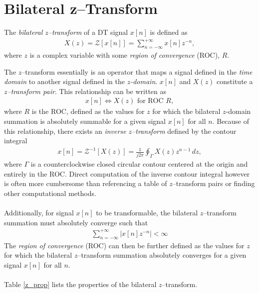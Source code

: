 \documentclass{report}
\begin{document}
\section{Bilateral z--Transform}
\begin{tcolorbox}[width=\textwidth,colback={white}, sharp corners]
    The \emph{bilateral $z$--transform} of a DT signal $x[n]$ is defined as  
    \begin{align}
        X(z) = \mathcal{Z}[x[n]] = \sum_{n=-\infty}^{+\infty} x[n] z^{-n},
    \end{align}
    where $z$ is a complex variable with some \emph{region of convergence} (ROC), $R$. 
\end{tcolorbox}
\noindent The $z$--transform essentially is an operator that maps a signal defined in the \emph{time domain} to another signal 
defined in the \emph{$z$-domain}. $x[n]$ and $X(z)$ constitute a \emph{$z$--transform pair}. This relationship can be written as 
\begin{align}
    x[n] \iff X(z) \text{ for ROC } R,
\end{align}
where $R$ is the ROC, defined as the values for $z$ for which the bilateral $z$-domain summation is absolutely summable 
for a given signal $x[n]$ for all $n$. Because of this relationship, there exists an \emph{inverse $z$--transform} defined by 
the contour integral
\begin{align}
    x[n] = \mathcal{Z}^{-1}[X(z)] = \frac{1}{j2\pi}\oint\nolimits_{\Gamma} X(z) z^{n-1} \,dz,
\end{align}
where $\Gamma$ is a counterclockwise closed circular contour centered at the origin and entirely in the ROC.
Direct computation of the inverse contour integral however is often more cumbersome than referencing a table of $z$--transform pairs 
or finding other computational methods.
\\ \\
Additionally, for signal $x[n]$ to be transformable, the bilateral $z$--transform summation must absolutely converge such that 
\begin{align}
    \sum_{n=-\infty}^{+\infty} |x[n] z^{-n}| < \infty
\end{align}
The \emph{region of convergence} (ROC) can then be further defined as the values for $z$ for which the bilateral $z$--transform summation absolutely 
converges for a given signal $x[n]$ for all $n$. 
\\ \\
Table \ref{z_prop} lists the properties of the bilateral $z$--transform.
\end{document}
